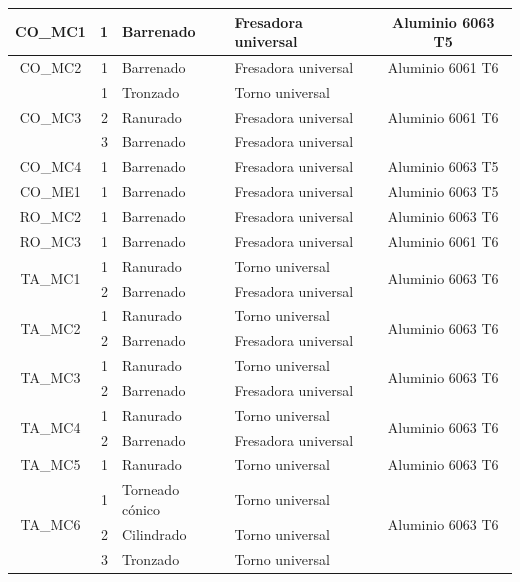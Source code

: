 \begin{longtable}{@{}|c|r|l|l|c|}
	CO\_MC1 & 1 & Barrenado & Fresadora universal & Aluminio 6063 T5 \\
    \hline
    CO\_MC2 & 1 & Barrenado & Fresadora universal & Aluminio 6061 T6 \\
    \hline
    \multirow{3}[6]{*}{CO\_MC3} & 1 & Tronzado & Torno universal & \multirow{3}[6]{*}{Aluminio 6061 T6} \\
    \cline{2-4}      & 2 & Ranurado & Fresadora universal &  \\
    \cline{2-4}      & 3 & Barrenado & Fresadora universal &  \\
    \hline
    CO\_MC4 & 1 & Barrenado & Fresadora universal & Aluminio 6063 T5 \\
    \hline
    CO\_ME1 & 1 & Barrenado & Fresadora universal & Aluminio 6063 T5 \\
    \hline
    RO\_MC2 & 1 & Barrenado & Fresadora universal & Aluminio 6063 T6 \\
    \hline
    RO\_MC3 & 1 & Barrenado & Fresadora universal & Aluminio 6061 T6 \\
    \hline
    \multirow{2}[4]{*}{TA\_MC1} & 1 & Ranurado  & Torno universal & \multirow{2}[4]{*}{Aluminio 6063 T6} \\
    \cline{2-4}      & 2 & Barrenado & Fresadora universal &  \\
    \hline
    \multirow{2}[4]{*}{TA\_MC2} & 1 & Ranurado  & Torno universal & \multirow{2}[4]{*}{Aluminio 6063 T6} \\
    \cline{2-4}      & 2 & Barrenado & Fresadora universal &  \\
    \hline
    \multirow{2}[4]{*}{TA\_MC3} & 1 & Ranurado  & Torno universal & \multirow{2}[4]{*}{Aluminio 6063 T6} \\
    \cline{2-4}      & 2 & Barrenado & Fresadora universal &  \\
    \hline
    \multirow{2}[4]{*}{TA\_MC4} & 1 & Ranurado  & Torno universal & \multirow{2}[4]{*}{Aluminio 6063 T6} \\
    \cline{2-4}      & 2 & Barrenado & Fresadora universal &  \\
    \hline
    TA\_MC5 & 1 & Ranurado  & Torno universal & Aluminio 6063 T6 \\
    \hline
    \multirow{5}[10]{*}{TA\_MC6} & 1 & Torneado cónico & Torno universal & \multirow{5}[10]{*}{Aluminio 6063 T6} \\
    \cline{2-4}      & 2 & Cilindrado & Torno universal &  \\
    \cline{2-4}      & 3 & Tronzado & Torno universal &  \\

\end{longtable}
